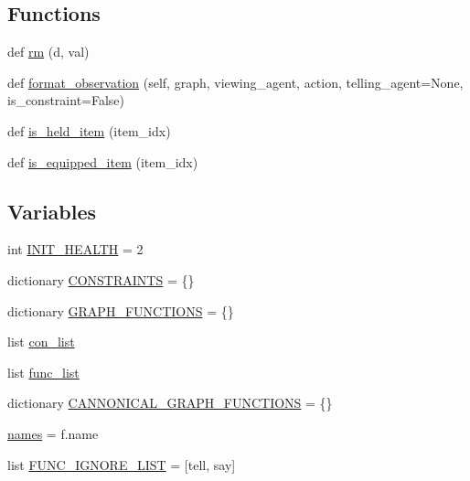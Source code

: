 \subsection*{Functions}
\begin{DoxyCompactItemize}
\item 
def \hyperlink{namespacelight__chats_1_1graph_a1e4fb75c70e6fbe0b134e3fe135deeba}{rm} (d, val)
\item 
def \hyperlink{namespacelight__chats_1_1graph_a6d359942394976812f0055affc289f56}{format\+\_\+observation} (self, graph, viewing\+\_\+agent, action, telling\+\_\+agent=None, is\+\_\+constraint=False)
\item 
def \hyperlink{namespacelight__chats_1_1graph_aa0be6ee7e9f549a7195bea9dfb962ad6}{is\+\_\+held\+\_\+item} (item\+\_\+idx)
\item 
def \hyperlink{namespacelight__chats_1_1graph_a76960b89046df1b0cda1de931fa1fd69}{is\+\_\+equipped\+\_\+item} (item\+\_\+idx)
\end{DoxyCompactItemize}
\subsection*{Variables}
\begin{DoxyCompactItemize}
\item 
int \hyperlink{namespacelight__chats_1_1graph_aa2b10178cd5b83c71bb11a2c3b29b2ef}{I\+N\+I\+T\+\_\+\+H\+E\+A\+L\+TH} = 2
\item 
dictionary \hyperlink{namespacelight__chats_1_1graph_a97d73c4d58258f6b8616fb163da4f039}{C\+O\+N\+S\+T\+R\+A\+I\+N\+TS} = \{\}
\item 
dictionary \hyperlink{namespacelight__chats_1_1graph_aef0ee3d4a8683c7ef63b2669c527b23d}{G\+R\+A\+P\+H\+\_\+\+F\+U\+N\+C\+T\+I\+O\+NS} = \{\}
\item 
list \hyperlink{namespacelight__chats_1_1graph_ace36e19843bd13fa12f329197aa50184}{con\+\_\+list}
\item 
list \hyperlink{namespacelight__chats_1_1graph_ac24f4da0b1507f9a09817c9ccf2f8058}{func\+\_\+list}
\item 
dictionary \hyperlink{namespacelight__chats_1_1graph_a3016377e3a8bd1b935e014e8e8624858}{C\+A\+N\+N\+O\+N\+I\+C\+A\+L\+\_\+\+G\+R\+A\+P\+H\+\_\+\+F\+U\+N\+C\+T\+I\+O\+NS} = \{\}
\item 
\hyperlink{namespacelight__chats_1_1graph_a5d66043a69755da3f991ab044bdc67ed}{names} = f.\+name
\item 
list \hyperlink{namespacelight__chats_1_1graph_aa2daac624f9a87ba88bfdae4480a3e93}{F\+U\+N\+C\+\_\+\+I\+G\+N\+O\+R\+E\+\_\+\+L\+I\+ST} = \mbox{[}\textquotesingle{}tell\textquotesingle{}, \textquotesingle{}say\textquotesingle{}\mbox{]}
\end{DoxyCompactItemize}


